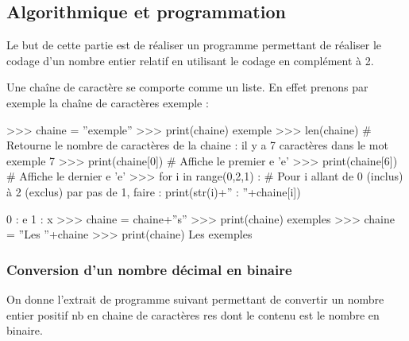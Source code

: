 \documentclass[10pt]{article}
\newif\ifprof
\begin{document}
\setcounter{subparagraph}{6}
%



\subsection{Algorithmique et programmation}
\ifprof
\else
Le but de cette partie est de réaliser un programme permettant de réaliser le codage d'un nombre entier relatif en utilisant le codage en complément à 2. 

\begin{py}
Une chaîne de caractère se comporte comme un liste. En effet prenons par exemple la chaîne de caractères \textsf{exemple} :

\begin{minipage}[c]{.95\linewidth}
\begin{python}
>>> chaine = ''exemple''
>>> print(chaine)
        exemple
>>> len(chaine)  # Retourne le nombre de caractères de la chaine : il y a 7 caractères dans le mot exemple
        7
>>> print(chaine[0]) # Affiche le premier e
        'e'
>>> print(chaine[6]) # Affiche le dernier e
        'e'
>>> for i in range(0,2,1) : # Pour i allant de 0 (inclus) à 2 (exclus) par pas de 1, faire : 
            print(str(i)+'' : ''+chaine[i])
            
        0 : e
        1 : x
>>> chaine = chaine+''s''
>>> print(chaine)
        exemples
>>> chaine = ''Les ''+chaine
>>> print(chaine)
        Les exemples
\end{python}
\end{minipage}
\end{py}
\fi
\subsubsection{Conversion d'un nombre décimal en binaire}
\ifprof
\else

On donne l'extrait de programme suivant permettant de convertir un nombre entier positif \textsf{nb} en chaine de caractères \textsf{res} dont le contenu est le nombre en binaire. 
\end{document}
